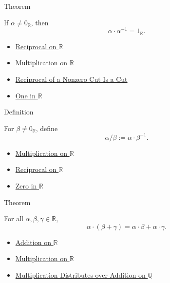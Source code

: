 \begin{theorembox}{Theorem}
\begin{theorem}
\label{thm:reciprocal-multiplicative-inverse-on-r}
If $\alpha\ne0_{\mathbb{R}}$, then
\[
\alpha\cdot\alpha^{-1}=1_{\mathbb{R}}.
\]
\end{theorem}
\end{theorembox}

\begin{dependencies}
\begin{itemize}
  \item \hyperref[def:reciprocal-on-r]{Reciprocal on $\mathbb{R}$}
  \item \hyperref[def:multiplication-on-r]{Multiplication on $\mathbb{R}$}
  \item \hyperref[lem:reciprocal-is-a-cut]{Reciprocal of a Nonzero Cut Is a Cut}
  \item \hyperref[def:one-in-r]{One in $\mathbb{R}$}
\end{itemize}
\end{dependencies}

\begin{definitionbox}{Definition}
\begin{definition}
\label{def:division-on-r}
For $\beta\ne0_{\mathbb{R}}$, define
\[
\alpha/\beta:=\alpha\cdot\beta^{-1}.
\]
\end{definition}
\end{definitionbox}

\begin{dependencies}
\begin{itemize}
  \item \hyperref[def:multiplication-on-r]{Multiplication on $\mathbb{R}$}
  \item \hyperref[def:reciprocal-on-r]{Reciprocal on $\mathbb{R}$}
  \item \hyperref[def:zero-in-r]{Zero in $\mathbb{R}$}
\end{itemize}
\end{dependencies}

\begin{theorembox}{Theorem}
\begin{theorem}
\label{thm:distributivity-on-r}
For all $\alpha,\beta,\gamma\in\mathbb{R}$,
\[
\alpha\cdot(\beta+\gamma)=\alpha\cdot\beta+\alpha\cdot\gamma.
\]
\end{theorem}
\end{theorembox}

\begin{dependencies}
\begin{itemize}
  \item \hyperref[def:addition-on-r]{Addition on $\mathbb{R}$}
  \item \hyperref[def:multiplication-on-r]{Multiplication on $\mathbb{R}$}
  \item \hyperref[thm:multiplication-distributes-over-addition-on-q]{Multiplication Distributes over Addition on $\mathbb{Q}$}
\end{itemize}
\end{dependencies}
